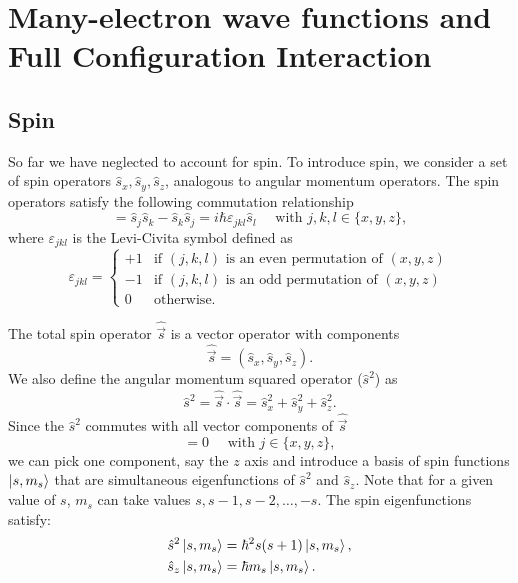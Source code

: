 \documentclass[../Main/chem532-notes.tex]{subfiles}
\begin{document}
\chapter{Many-electron wave functions and Full Configuration Interaction}

\section{Spin}
So far we have neglected to account for spin.
To introduce spin, we consider a set of spin operators $\hat{s}_x, \hat{s}_y, \hat{s}_z$, analogous to angular momentum operators.
The spin operators satisfy the following commutation relationship
\begin{equation}
[\hat{s}_{j},\hat{s}_{k}] = \hat{s}_{j}\hat{s}_{k} - \hat{s}_{k}\hat{s}_{j}= i \hbar \varepsilon_{jkl} \hat{s}_{l} \quad \text{ with } j,k,l \in \{x,y,z\},
\end{equation}
where $\varepsilon_{jkl}$ is the Levi-Civita symbol defined as
\begin{equation}
\varepsilon_{jkl} = \begin{cases}
+1 & \text{if $(j,k,l)$ is an even permutation of $(x,y,z)$} \\
-1 & \text{if $(j,k,l)$ is an odd permutation of $(x,y,z)$} \\
0 & \text{otherwise}.
\end{cases}
\end{equation}

The total spin operator $\hat{\vec{s}}$ is a vector operator with components
\begin{equation}
\hat{\vec{s}} = (\hat{s}_x, \hat{s}_y, \hat{s}_z).
\end{equation}
We also define the angular momentum squared operator ($\hat{s}^2$) as
\begin{equation}
\hat{s}^2 = \hat{\vec{s}} \cdot \hat{\vec{s}} = \hat{s}_x^2 + \hat{s}_y^2 + \hat{s}_z^2.
\end{equation}
Since the $\hat{s}^2$ commutes with all vector components of $\hat{\vec{s}}$
\begin{equation}
[\hat{s}^2,\hat{s}_j] = 0 \quad \text{ with } j \in \{x,y,z\},
\end{equation}
we can pick one component, say the $z$ axis and introduce a basis of spin functions $\ket{s,m_s}$ that are simultaneous eigenfunctions of $\hat{s}^2$ and $\hat{s}_z$. Note that for a given value of $s$, $m_s$ can take values $s, s -1, s-2, \ldots, -s$.
The spin eigenfunctions satisfy:
\begin{align}
\hat{s}^2 \ket{s,m_s} &= \hbar^2 s(s+1) \ket{s,m_s}, \\
\hat{s}_z \ket{s,m_s} &= \hbar m_s \ket{s,m_s}.
\end{align}
\end{document}
